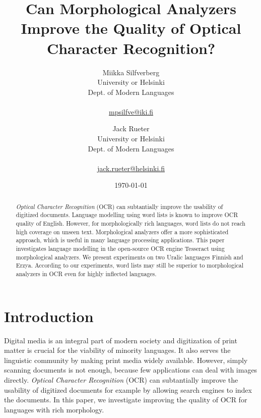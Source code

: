 \documentclass[b5paper]{article}
\begin{document}
\title{Can Morphological Analyzers Improve the Quality of Optical Character Recognition?}

\author{Miikka Silfverberg\\
University or Helsinki\\
Dept. of Modern Languages\\
\\
\url{mpsilfve@iki.fi} \and
Jack Rueter\\
University or Helsinki\\
Dept. of Modern Languages\\
\\
\url{jack.rueter@helsinki.fi} 
}

\date{\today}

\maketitle

\begin{abstract}
  {\it Optical Character Recognition} (OCR) can subtantially improve
  the usability of digitized documents. Language modelling using word
  lists is known to improve OCR quality of English. However, for
  morphologically rich languages, word lists do not reach high
  coverage on unseen text. Morphological analyzers offer a more
  sophisticated approach, which is useful in many language processing
  applications. This paper investigates language modelling in the
  open-source OCR engine Tesseract using morphological analyzers. We
  present experiments on two Uralic languages Finnish and
  Erzya. According to our experiments, word lists may still be
  superior to morphological analyzers in OCR even for highly inflected
  languages.
\end{abstract}

\section{Introduction}

Digital media is an integral part of modern society and digitization
of print matter is crucial for the viability of minority languages. It
also serves the linguistic community by making print media widely
available. However, simply scanning documents is not enough, because
few applications can deal with images directly. {\it Optical Character
  Recognition} (OCR) can subtantially improve the usability of
digitized documents for example by allowing search engines to index
the documents. In this paper, we investigate improving the quality of
OCR for languages with rich morphology.
\end{document}
